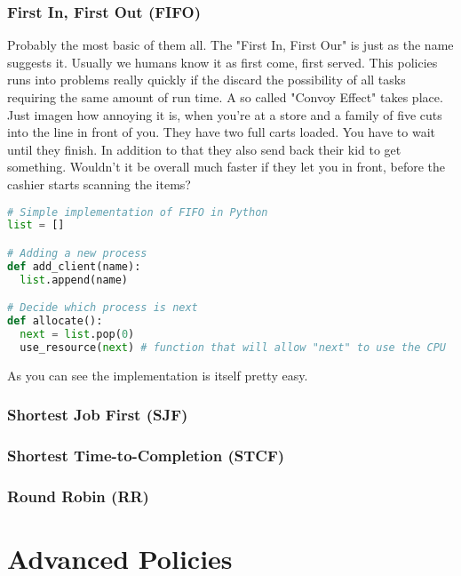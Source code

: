 \documentclass{report}
\begin{document}
\section{First In, First Out (FIFO)}

Probably the most basic of them all. The "First In, First Our" is just as the name suggests it. Usually we humans know it as first come, first served. This policies runs into problems really quickly if the discard the possibility of all tasks requiring the same amount of run time. A so called "Convoy Effect" takes place. Just imagen how annoying it is, when you're at a store and a family of five cuts into the line in front of you. They have two full carts loaded. You have to wait until they finish. In addition to that they also send back their kid to get something. Wouldn't it be overall much faster if they let you in front, before the cashier starts scanning the items?

\begin{lstlisting}[language=Python, style=colorEX]
# Simple implementation of FIFO in Python
list = []

# Adding a new process
def add_client(name):
  list.append(name)

# Decide which process is next
def allocate():
  next = list.pop(0)
  use_resource(next) # function that will allow "next" to use the CPU
\end{lstlisting}

As you can see the implementation is itself pretty easy.

\section{Shortest Job First (SJF)}

\section{Shortest Time-to-Completion (STCF)}

\section{Round Robin (RR)}





\part{Advanced Policies}
\end{document}
